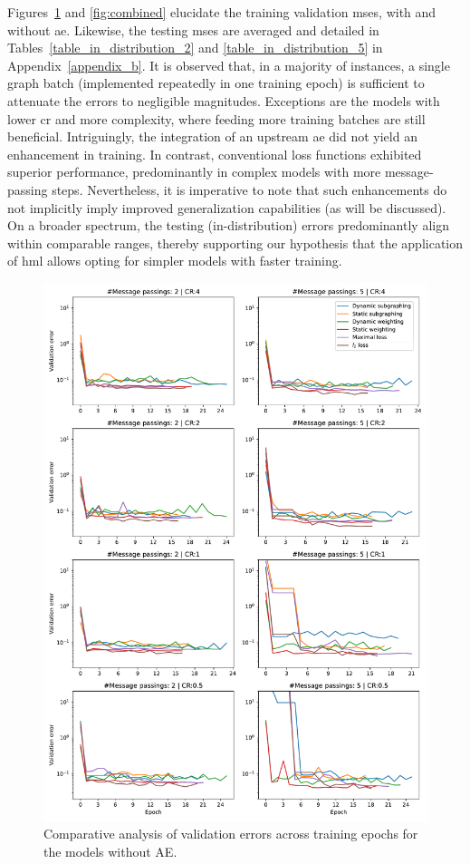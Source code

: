 \documentclass[12pt,a4paper]{report}
\begin{document}
Figures~\ref{fig:gnn} and \ref{fig:combined} elucidate the training validation \acp{mse}, with and without \ac{ae}. Likewise, the testing \acp{mse} are averaged and detailed in Tables~\ref{table_in_distribution_2} and \ref{table_in_distribution_5} in Appendix~\ref{appendix_b}. It is observed that, in a majority of instances, a single graph batch (implemented repeatedly in one training epoch) is sufficient to attenuate the errors to negligible magnitudes. Exceptions are the models with lower \ac{cr} and more complexity, where feeding more training batches are still beneficial. Intriguingly, the integration of an upstream \ac{ae} did not yield an enhancement in training. In contrast, conventional loss functions exhibited superior performance, predominantly in complex models with more message-passing steps. Nevertheless, it is imperative to note that such enhancements do not implicitly imply improved generalization capabilities (as will be discussed). On a broader spectrum, the testing (in-distribution) errors predominantly align within comparable ranges, thereby supporting our hypothesis that the application of \ac{hml} allows opting for simpler models with faster training.
%
\begin{figure}\centering
\includegraphics[width=1\linewidth,keepaspectratio]{gnn.pdf}
\caption{Comparative analysis of validation errors across training epochs for the models without AE.}\label{fig:gnn}
\end{figure}
\end{document}
